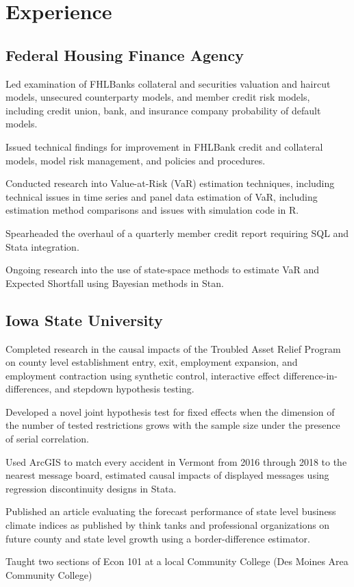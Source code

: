 \documentclass[letterpaper]{article}
\renewenvironment{itemize}{
  \begin{list}{}{
    \setlength{\leftmargin}{0em}
  }
}{
  \end{list}
}
\begin{document}
\section*{Experience}
\subsection*{Federal Housing Finance Agency}
\begin{itemize}
\item Led examination of FHLBanks collateral and securities valuation and haircut models, unsecured counterparty models, and member credit risk models, including credit union, bank, and insurance company probability of default models.
\item Issued technical findings for improvement in FHLBank credit and collateral models, model risk management, and policies and procedures.
\item Conducted research into Value-at-Risk (VaR) estimation techniques, including technical issues in time series and panel data estimation of VaR, including estimation method comparisons and issues with simulation code in R.
\item Spearheaded the overhaul of a quarterly member credit report requiring SQL and Stata integration.
\item Ongoing research into the use of state-space methods to estimate VaR and Expected Shortfall using Bayesian methods in Stan.
\end{itemize}
\subsection*{Iowa State University}
\begin{itemize}
\item Completed research in the causal impacts of the Troubled Asset Relief Program on county level establishment entry, exit, employment expansion, and employment contraction using synthetic control, interactive effect difference-in-differences, and stepdown hypothesis testing.
\item Developed a novel joint hypothesis test for fixed effects when the dimension of the number of tested restrictions grows with the sample size under the presence of serial correlation.
\item Used ArcGIS to match every accident in Vermont from 2016 through 2018 to the nearest message board, estimated causal impacts of displayed messages using regression discontinuity designs in Stata.
\item Published an article evaluating the forecast performance of state level business climate indices as published by think tanks and professional organizations on future county and state level growth using a border-difference estimator.
\item Taught two sections of Econ 101 at a local Community College (Des Moines Area Community College)
\end{itemize}
\end{document}
